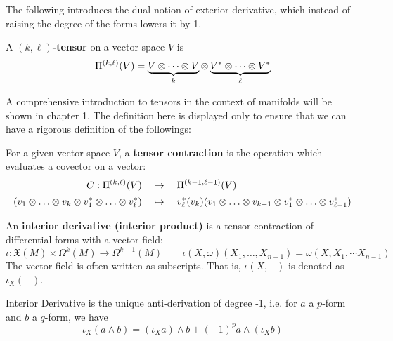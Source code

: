 \documentclass{article}
\begin{document}
\textstart
The following introduces the dual notion of exterior derivative, which instead of raising the degree of the forms lowers it by 1.

\begin{definition}[Tensor]
    A \textbf{$(k, \ell)$-tensor} on a vector space $V$ is
    \[
        \Pi^{(k, \ell)}(V) = \underbrace{V \otimes \cdots \otimes V}_{k} \otimes \underbrace{V^{\ast} \otimes \cdots \otimes V^{\ast}}_{\ell}
    \]
\end{definition}

\textstart
A comprehensive introduction to tensors in the context of manifolds will be shown in chapter 1. The definition here is displayed only to ensure that we can have a rigorous definition of the followings:

\begin{definition}
    For a given vector space $V$, a \textbf{tensor contraction} is the operation which evaluates a covector on a vector:
    \begin{align*}
        C: \Pi^{(k, \ell)}(V)\quad & \to \quad \Pi^{(k - 1, \ell - 1)}(V) \\[2pt]
        (v_1 \tensor \dots \tensor v_k \tensor v_1^{\ast} \tensor \dots \tensor v_{\ell}^{\ast})\quad & \mapsto \quad v_{\ell}^{\ast}(v_k) (v_1 \tensor \dots \tensor v_{k - 1} \tensor v_1^{\ast} \tensor \dots \tensor v_{\ell - 1}^{\ast})
    \end{align*}
\end{definition}

\begin{definition}
    An \textbf{interior derivative (interior product)} is a tensor contraction of differential forms with a vector field:
    \[
        \iota: \mathfrak{X}(M) \times \Omega^{k}(M) \to \Omega^{k-1}(M) \qquad \iota(X, \omega)(X_1, \dots, X_{n-1}) = \omega(X, X_1, \dotsm X_{n-1})
    \]
    The vector field is often written as subscripts. That is, $\iota(X, -)$ is denoted as $\iota_X(-)$.
\end{definition}

\begin{proposition}
    Interior Derivative is the unique anti-derivation of degree -1, i.e. for $a$ a $p$-form and $b$ a $q$-form, we have
    \[
        \iota_X(a \wedge b) = (\iota_X a) \wedge b + (-1)^p a \wedge (\iota_X b)
    \]
\end{proposition}
\end{document}
